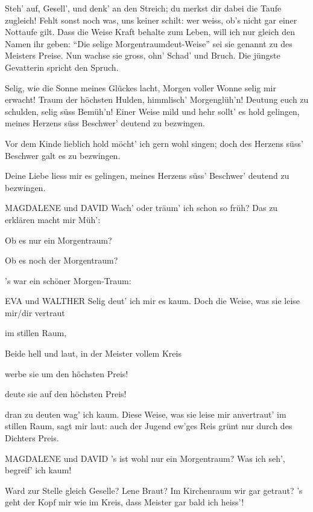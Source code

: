 \begin{drama}
Steh' auf, Gesell', und denk' an den Streich;
du merkst dir dabei die Taufe zugleich!
Fehlt sonst noch was, uns keiner schilt:
wer weiss, ob's nicht gar einer Nottaufe gilt.
Dass die Weise Kraft behalte zum Leben,
will ich nur gleich den Namen ihr geben:
``Die selige Morgentraumdeut-Weise''
sei sie genannt zu des Meisters Preise.
Nun wachse sie gross, ohn' Schad' und Bruch.
Die jüngste Gevatterin spricht den Spruch.


\Evaspeaks
Selig, wie die Sonne
meines Glückes lacht,
Morgen voller Wonne
selig mir erwacht!
Traum der höchsten Hulden,
himmlisch' Morgenglüh'n!
Deutung euch zu schulden,
selig süss Bemüh'n!
Einer Weise mild und hehr
sollt' es hold gelingen,
meines Herzens süss Beschwer'
deutend zu bezwingen.

\Sachsspeaks
Vor dem Kinde lieblich hold
möcht' ich gern wohl singen;
doch des Herzens süss' Beschwer
galt es zu bezwingen.

\Waltherspeaks
Deine Liebe liess mir es gelingen,
meines Herzens süss' Beschwer' deutend zu bezwingen.

MAGDALENE und DAVID
Wach' oder träum' ich schon so früh?
Das zu erklären macht mir Müh':

\Evaspeaks
Ob es nur ein Morgentraum?

\Waltherspeaks
Ob es noch der Morgentraum?

\Sachsspeaks
's war ein schöner Morgen-Traum:

EVA und WALTHER
Selig deut' ich mir es kaum.
Doch die Weise, was sie leise
mir/dir vertraut

\Waltherspeaks
im stillen Raum,

Beide
hell und laut,
in der Meister vollem Kreis

\Waltherspeaks
werbe sie um den höchsten Preis!

\Evaspeaks
deute sie auf den höchsten Preis!

\Sachsspeaks
dran zu deuten wag' ich kaum.
Diese Weise, was sie leise
mir anvertraut' im stillen Raum,
sagt mir laut:
auch der Jugend ew'ges Reis
grünt nur durch des Dichters Preis.

MAGDALENE und DAVID
's ist wohl nur ein Morgentraum?
Was ich seh', begreif' ich kaum!

\Davidspeaks
Ward zur Stelle gleich Geselle?
Lene Braut?
Im Kirchenraum wir gar getraut?
's geht der Kopf mir wie im Kreis,
dass Meister gar bald ich heiss'!


\end{drama}
